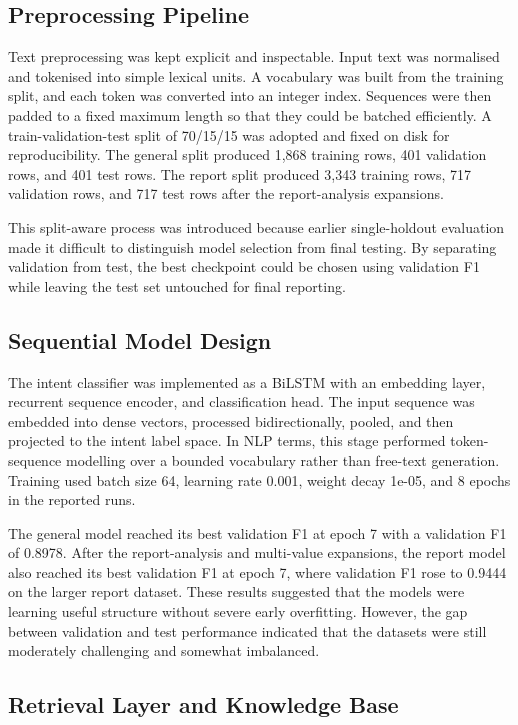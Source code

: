 \subsection{Preprocessing Pipeline}

Text preprocessing was kept explicit and inspectable. Input text was normalised and tokenised into simple lexical units. A vocabulary was built from the training split, and each token was converted into an integer index. Sequences were then padded to a fixed maximum length so that they could be batched efficiently. A train-validation-test split of 70/15/15 was adopted and fixed on disk for reproducibility. The general split produced 1,868 training rows, 401 validation rows, and 401 test rows. The report split produced 3,343 training rows, 717 validation rows, and 717 test rows after the report-analysis expansions.

This split-aware process was introduced because earlier single-holdout evaluation made it difficult to distinguish model selection from final testing. By separating validation from test, the best checkpoint could be chosen using validation F1 while leaving the test set untouched for final reporting.

\subsection{Sequential Model Design}

The intent classifier was implemented as a BiLSTM with an embedding layer, recurrent sequence encoder, and classification head. The input sequence was embedded into dense vectors, processed bidirectionally, pooled, and then projected to the intent label space. In NLP terms, this stage performed token-sequence modelling over a bounded vocabulary rather than free-text generation. Training used batch size 64, learning rate 0.001, weight decay 1e-05, and 8 epochs in the reported runs.

The general model reached its best validation F1 at epoch 7 with a validation F1 of 0.8978. After the report-analysis and multi-value expansions, the report model also reached its best validation F1 at epoch 7, where validation F1 rose to 0.9444 on the larger report dataset. These results suggested that the models were learning useful structure without severe early overfitting. However, the gap between validation and test performance indicated that the datasets were still moderately challenging and somewhat imbalanced.

\subsection{Retrieval Layer and Knowledge Base}


